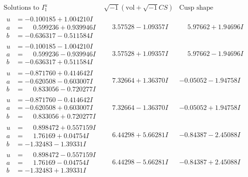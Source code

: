 \documentclass[1p]{elsarticle_modified}
\theoremstyle{definition}
\newcommand{\I}{\sqrt{-1}}
\begin{document}
$$\begin{array}{c|c|c}  
\text{Solutions to }I^u_{1}& \I (\text{vol} + \sqrt{-1}CS) & \text{Cusp shape}\\
 \hline 
\begin{aligned}
u &= -0.100185 + 1.004210 I \\
a &= \phantom{-}0.599236 + 0.939946 I \\
b &= -0.636317 - 0.511584 I\end{aligned}
 & \phantom{-}3.57528 - 1.09357 I & \phantom{-}5.97662 + 1.94696 I \\ \hline\begin{aligned}
u &= -0.100185 - 1.004210 I \\
a &= \phantom{-}0.599236 - 0.939946 I \\
b &= -0.636317 + 0.511584 I\end{aligned}
 & \phantom{-}3.57528 + 1.09357 I & \phantom{-}5.97662 - 1.94696 I \\ \hline\begin{aligned}
u &= -0.871760 + 0.414642 I \\
a &= -0.620508 - 0.603007 I \\
b &= \phantom{-}0.833056 - 0.720277 I\end{aligned}
 & \phantom{-}7.32664 + 1.36370 I & -0.05052 - 1.94758 I \\ \hline\begin{aligned}
u &= -0.871760 - 0.414642 I \\
a &= -0.620508 + 0.603007 I \\
b &= \phantom{-}0.833056 + 0.720277 I\end{aligned}
 & \phantom{-}7.32664 - 1.36370 I & -0.05052 + 1.94758 I \\ \hline\begin{aligned}
u &= \phantom{-}0.898472 + 0.557159 I \\
a &= \phantom{-}1.76169 + 0.04754 I \\
b &= -1.32483 - 1.39331 I\end{aligned}
 & \phantom{-}6.44298 + 5.66281 I & -0.84387 - 2.45088 I \\ \hline\begin{aligned}
u &= \phantom{-}0.898472 - 0.557159 I \\
a &= \phantom{-}1.76169 - 0.04754 I \\
b &= -1.32483 + 1.39331 I\end{aligned}
 & \phantom{-}6.44298 - 5.66281 I & -0.84387 + 2.45088 I \\ \hline\begin{aligned}

\end{aligned}
\end{array}$$
\end{document}
